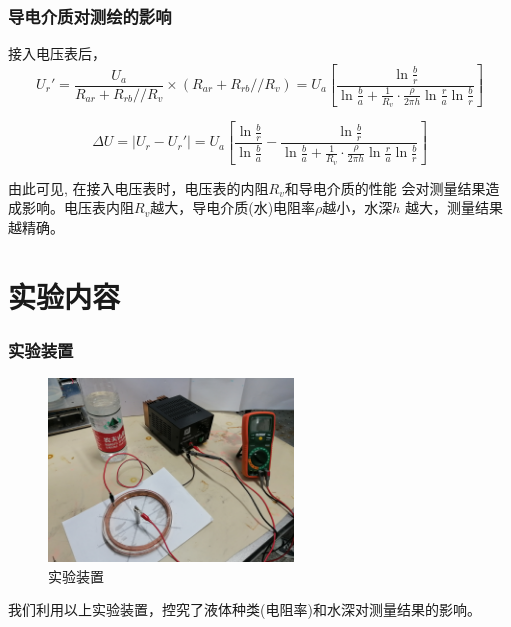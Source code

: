 \documentclass{beamer}
\begin{document}
    \begin{frame}
        \frametitle{导电介质对测绘的影响}
        
           
        接入电压表后，$$U_r' = \frac{U_a}{R_{ar} + R_{rb} // R_v} \times ({R_{ar} + R_{rb} // R_v}) 
        = U_a[\frac{\ln \frac{b}{r}}{\ln \frac ba + \frac{1}{R_v} \cdot \frac{\rho}{2 \pi h} \ln \frac ra \ln \frac br  }] $$
        
        $$
        \Delta U = |U_r - U_r'| = U_a[ \frac{\ln \frac br}{\ln \frac ba} -  \frac{\ln \frac{b}{r}}{\ln \frac ba + 
            \frac{1}{R_v} \cdot \frac{\rho}{2 \pi h}
             \ln \frac ra \ln \frac br  } ]
        $$
        
        由此可见, 在接入电压表时，电压表的内阻$R_v$和导电介质的性能
        会对测量结果造成影响。电压表内阻$R_v$越大，导电介质(水)电阻率$\rho$越小，水深$h$
        越大，测量结果越精确。

        

    \end{frame}
    
    \section{实验内容}

    \begin{frame}
        \frametitle{实验装置}
        \begin{figure}
            \includegraphics[width=6.5cm]{实验装置}
            \caption{实验装置}
        \end{figure}
        我们利用以上实验装置，控究了液体种类(电阻率)和水深对测量结果的影响。
    \end{frame}
\end{document}
